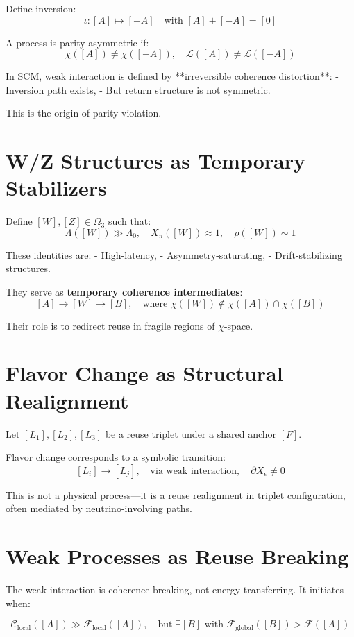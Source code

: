 Define inversion:
\[
\iota: [A] \mapsto [-A]
\quad \text{with } [A] + [-A] = [0]
\]

A process is parity asymmetric if:
\[
\chi([A]) \ne \chi([-A]),\quad \mathcal{L}([A]) \ne \mathcal{L}([-A])
\]

In SCM, weak interaction is defined by **irreversible coherence distortion**:
- Inversion path exists,
- But return structure is not symmetric.

This is the origin of parity violation.

\section{W/Z Structures as Temporary Stabilizers} \label{sec:wz-roles}

Define $[W], [Z] \in \Omega_3$ such that:
\[
\Lambda([W]) \gg \Lambda_0,\quad X_\pi([W]) \approx 1,\quad \rho([W]) \sim 1
\]

These identities are:
- High-latency,
- Asymmetry-saturating,
- Drift-stabilizing structures.

They serve as \textbf{temporary coherence intermediates}:
\[
[A] \to [W] \to [B],\quad \text{where } \chi([W]) \notin \chi([A]) \cap \chi([B])
\]

Their role is to redirect reuse in fragile regions of $\chi$-space.

\section{Flavor Change as Structural Realignment} \label{sec:flavor}

Let $[L_1], [L_2], [L_3]$ be a reuse triplet under a shared anchor $[F]$.

Flavor change corresponds to a symbolic transition:
\[
[L_i] \to [L_j],\quad \text{via weak interaction},\quad \partial X_\epsilon \ne 0
\]

This is not a physical process—it is a reuse realignment in triplet configuration, often mediated by neutrino-involving paths.

\section{Weak Processes as Reuse Breaking} \label{sec:weak-reuse-break}

The weak interaction is coherence-breaking, not energy-transferring. It initiates when:

\[
\mathcal{C}_{\text{local}}([A]) \gg \mathcal{F}_{\text{local}}([A]),\quad \text{but } \exists [B] \text{ with } \mathcal{F}_{\text{global}}([B]) > \mathcal{F}([A])
\]

